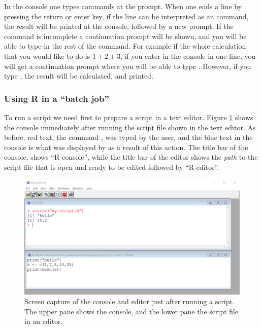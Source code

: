 \documentclass[krantz2]{krantz}\usepackage{knitr}%
\begin{document}
\begin{explainbox}
In the console one types commands at the \code{>} prompt. When one ends a line by pressing the return or enter key, if the line can be interpreted as an \Rlang command, the result will be printed at the console, followed by a new \code{>} prompt.
If the command is incomplete a \code{+} continuation prompt will be shown, and you will be able to type-in the rest of the command. For example if the whole calculation that you would like to do is $1 + 2 + 3$, if you enter in the console  in one line, you will get a continuation prompt where you will be able to type . However, if you type , the result will be calculated, and printed.
\end{explainbox}

\subsubsection{Using R in a ``batch job''}

To run a script we need first to prepare a script in a text editor. Figure \ref{fig:intro:script} shows the console immediately after running the script file shown in the text editor. As before, red text, the command , was typed by the user, and the blue text in the console is what was displayed by \Rpgrm as a result of this action. The title bar of the console, shows ``R-console'', while the title bar of the editor shows the \emph{path} to the script file that is open and ready to be edited followed by ``R-editor''.

\begin{figure}
  \centering
  \includegraphics[width=\linewidth]{figures/R-console-script}
  \caption[Script sourced at the R console]{Screen capture of the \Rpgrm console and editor just after running a script. The upper pane shows the \Rpgrm console, and the lower pane the script file in an editor. }\label{fig:intro:script}
\end{figure}
\end{document}
